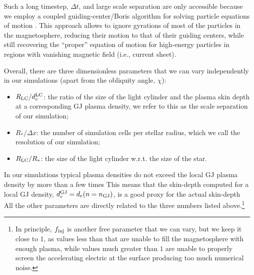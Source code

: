 Such a long timestep, $\Delta t$, and large scale separation are only accessible because we employ a coupled guiding-center/Boris algorithm for solving particle equations of motion \citep{2020ApJS..251...10B}. This approach allows to ignore gyrations of most of the particles in the magnetosphere, reducing their motion to that of their guiding centers, while still recovering the ``proper'' equation of motion for high-energy particles in regions with vanishing magnetic field (i.e., current sheet).

Overall, there are three dimensionless parameters that we can vary independently in our simulations (apart from the obliquity angle, $\chi$):
\begin{itemize}
    \item $R_{\rm LC} / d_e^{\rm LC}$: the ratio of the size of the light cylinder and the plasma skin depth at a corresponding GJ plasma density, we refer to this as the scale separation of our simulation;
    \item $R_* / \Delta x$: the number of simulation cells per stellar radius, which we call the resolution of our simulation;
    \item $R_{\rm LC} / R_*$: the size of the light cylinder w.r.t. the size of the star.
\end{itemize}
\noindent In our simulations typical plasma densities do not exceed the local GJ plasma density by more than a few times This means that the skin-depth computed for a local GJ density, $d_e^{\rm GJ} = d_e(n=n_{\rm GJ})$, is a good proxy for the actual skin-depth All the other parameters are directly related to the three numbers listed above.\footnote{In principle, $f_{\rm inj}$ is another free parameter that we can vary, but we keep it close to $1$, as values less than that are unable to fill the magnetosphere with enough plasma, while values much greater than $1$ are unable to properly screen the accelerating electric at the surface producing too much numerical noise.}

